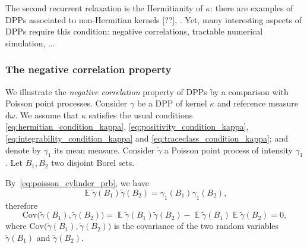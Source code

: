 \documentclass[twoside,11pt]{book}
\numberwithin{theorem}{chapter}
\numberwithin{definition}{chapter}
\numberwithin{proposition}{chapter}
\numberwithin{corollary}{chapter}
\numberwithin{example}{chapter}
\numberwithin{lemma}{chapter}
\numberwithin{assumption}{chapter}
\DeclareMathOperator{\EX}{\mathbb{E}}
\begin{document}



The second recurrent relaxation is the Hermitianity of $\kappa$: there are examples of DPPs associated to non-Hermitian kernels [??], \citep{Bru18}. Yet, many interesting aspects of DPPs require this condition: negative correlations, tractable numerical simulation, $\dots$


\subsubsection{The negative correlation property}
We illustrate  the \emph{negative correlation} property of DPPs by a comparison with Poisson point processes. Consider $\gamma$ be a DPP of kernel $\kappa$ and reference measure $\mathrm{d}\omega$. We assume that $\kappa$ satisfies the usual conditions \eqref{eq:hermitian_condition_kappa}, \eqref{eq:positivity_condition_kappa}, \eqref{eq:integrability_condition_kappa} and \eqref{eq:traceclass_condition_kappa}; and denote by $\gamma_1$ its mean measure. Consider $\tilde{\gamma}$ a Poisson point process of intensity $\gamma_{1}$. 
Let $B_{1}, B_{2}$ two disjoint Borel sets. 

By~\eqref{eq:poisson_cylinder_prb}, we have
\begin{equation}
\EX \tilde{\gamma}(B_{1}) \tilde{\gamma}(B_{2}) = \gamma_{1}(B_{1}) \gamma_{1}(B_{2}),
\end{equation}
therefore 
\begin{equation}\label{eq:cov_Poisson_gamma_B_1_B_2}
\mathrm{Cov} \Big(\tilde{\gamma}(B_{1}), \tilde{\gamma}(B_{2}) \Big) = \EX \tilde{\gamma}(B_{1}) \tilde{\gamma}(B_{2}) -\EX \tilde{\gamma}(B_{1}) \EX \tilde{\gamma}(B_{2}) = 0,
\end{equation}
where $\mathrm{Cov} \Big(\tilde{\gamma}(B_{1}), \tilde{\gamma}(B_{2}) \Big)$ is the covariance of the two random variables $\tilde{\gamma}(B_{1})$ and $\tilde{\gamma}(B_{2})$. 
\end{document}
